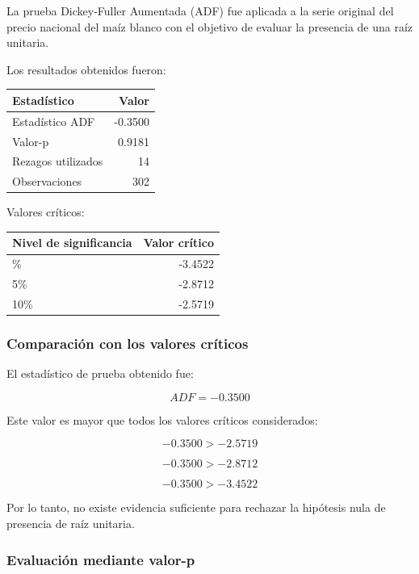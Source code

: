 \documentclass[11pt]{article}
\begin{document}
La prueba Dickey-Fuller Aumentada (ADF) fue aplicada a la serie original
del precio nacional del maíz blanco con el objetivo de evaluar la
presencia de una raíz unitaria.

Los resultados obtenidos fueron:

\begin{longtable}[]{@{}lr@{}}
\toprule\noalign{}
Estadístico & Valor \\
\midrule\noalign{}
\endhead
\bottomrule\noalign{}
\endlastfoot
Estadístico ADF & -0.3500 \\
Valor-p & 0.9181 \\
Rezagos utilizados & 14 \\
Observaciones & 302 \\
\end{longtable}

Valores críticos:

\begin{longtable}[]{@{}lr@{}}
\toprule\noalign{}
Nivel de significancia & Valor crítico \\
\midrule\noalign{}
\endhead
\bottomrule\noalign{}
\endlastfoot
1\% & -3.4522 \\
5\% & -2.8712 \\
10\% & -2.5719 \\
\end{longtable}

\hypertarget{comparaciuxf3n-con-los-valores-cruxedticos}{%
\subsubsection{Comparación con los valores
críticos}\label{comparaciuxf3n-con-los-valores-cruxedticos}}

El estadístico de prueba obtenido fue:

\[
ADF=-0.3500
\]

Este valor es mayor que todos los valores críticos considerados:

\[
-0.3500 > -2.5719
\]

\[
-0.3500 > -2.8712
\]

\[
-0.3500 > -3.4522
\]

Por lo tanto, no existe evidencia suficiente para rechazar la hipótesis
nula de presencia de raíz unitaria.

\hypertarget{evaluaciuxf3n-mediante-valor-p}{%
\subsubsection{Evaluación mediante
valor-p}\label{evaluaciuxf3n-mediante-valor-p}}
\end{document}

